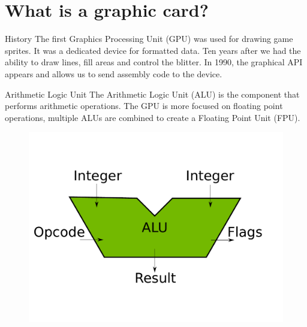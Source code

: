 \documentclass{beamer}
\begin{document}
\section{What is a graphic card?}
\begin{frame}{History}
	The first Graphics Processing Unit (GPU) was used for drawing game sprites. It was a dedicated device for formatted data. Ten years after we had the ability to draw lines, fill areas and control the blitter. In 1990, the graphical API appears and allows us to send assembly code to the device.
\end{frame}

\begin{frame}{Arithmetic Logic Unit}
	The Arithmetic Logic Unit (ALU) is the component that performs arithmetic operations. The GPU is more focused on floating point operations, multiple ALUs are combined to create a Floating Point Unit (FPU).
	\begin{figure}
		\includegraphics[scale=0.3]{figures/ALU.pdf}
	\end{figure}
\end{frame}
\end{document}
